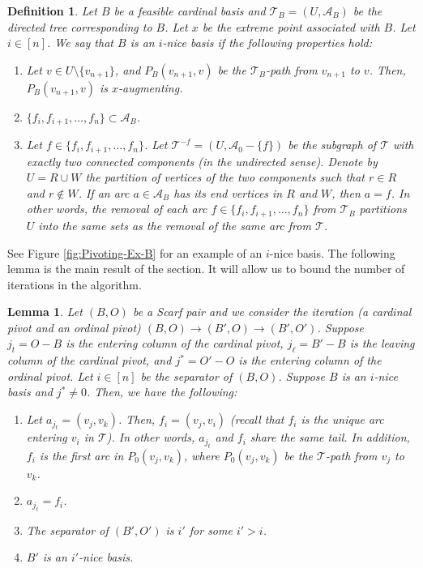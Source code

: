 \documentclass[11pt]{article}
\newtheorem{lemma}[theorem]{Lemma}
\newtheorem{definition}[theorem]{Definition}
\begin{document}
\begin{definition}\label{def:nice-basis}
Let $B$ be a feasible cardinal basis and $\mathcal{T}_B=(U,\mathcal{A}_B)$ be the directed tree corresponding to $B$. Let $x$ be the extreme point associated with $B$. Let $i\in[n]$. We say that $B$ is an \emph{$i$-nice basis} if the following properties hold:
    \begin{enumerate}
        \item[(i)] Let $v\in U\setminus\{v_{n+1}\}$, and $P_B(v_{n+1},v)$ be the $\mathcal{T}_B$-path from $v_{n+1}$ to $v$. Then, $P_B(v_{n+1},v)$ is $x$-augmenting. 
\item[(ii)] $\{f_i,f_{i+1},\dots,f_n\}\subset\mathcal{A}_B$. 
        \item[(iii)] Let $f\in\{f_i,f_{i+1},\dots,f_n\}$. Let $\mathcal{T}^{-f}=(U,\mathcal{A}_0-\{f\})$ be the subgraph of $\mathcal{T}$ with exactly two connected components (in the undirected sense). Denote by $U=R\cup W$ the partition of vertices of the two components such that $r\in R$ and $r\notin W$. If an arc $a\in\mathcal{A}_B$ has its end vertices in $R$ and $W$, then $a=f$. In other words, the removal of each arc $f\in \{f_i, f_{i+1}, \ldots, f_n\}$ from $\mathcal{T}_B$ partitions $U$ into the same sets as the removal of the same arc from $\mathcal{T}$.


\end{enumerate}
\end{definition}
See Figure \ref{fig:Pivoting-Ex-B} for an example of an $i$-nice basis. 
The following lemma is the main result of the section. It will allow us to bound the number of iterations in the algorithm. 
\begin{lemma}\label{lem:Out-Deg-1}
Let $(B,O)$ be a Scarf pair and we consider the iteration (a cardinal pivot and an ordinal pivot) $(B,O)\to(B',O)\to(B',O')$. Suppose $j_t=O-B$ is the entering column of the cardinal pivot, $j_\ell=B'-B$ is the leaving column of the cardinal pivot, and $j^*=O'-O$ is the entering column of the ordinal pivot. Let $i\in[n]$ be the separator of $(B,O)$. Suppose $B$ is an $i$-nice basis and $j^*\neq 0$. Then, we have the following: 
\begin{enumerate}
    \item\label{it:key-1} Let $a_{j_t}=(v_j,v_k)$. Then, $f_i=(v_j,v_i)$ (recall that $f_i$ is the unique arc entering $v_i$ in $\mathcal{T}$). In other words, $a_{j_t}$ and $f_i$ share the same tail. In addition, $f_i$ is the first arc in $P_0(v_j,v_k)$, where $P_0(v_j,v_k)$ be the $\mathcal{T}$-path from $v_j$ to $v_k$.
    \item\label{it:key-2} $a_{j_\ell}=f_i$.
\item\label{it:key-3} The separator of $(B',O')$ is $i'$ for some $i'>i$.
    \item\label{it:key-4} $B'$ is an $i'$-nice basis.
\end{enumerate}
\end{lemma}
\end{document}
